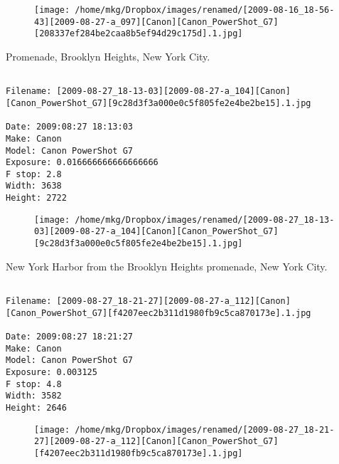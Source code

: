 \begin{figure}
\texttt{[image: /home/mkg/Dropbox/images/renamed/[2009-08-16\_18-56-43][2009-08-27-a\_097][Canon][Canon\_PowerShot\_G7][208337ef284be2caa8b5ef94d29c175d].1.jpg]}
\end{figure}
    
\clearpage
\onecolumn
\noindent Promenade, Brooklyn Heights, New York City.
\noindent
\begin{lstlisting}

Filename: [2009-08-27_18-13-03][2009-08-27-a_104][Canon][Canon_PowerShot_G7][9c28d3f3a000e0c5f805fe2e4be2be15].1.jpg

Date: 2009:08:27 18:13:03
Make: Canon
Model: Canon PowerShot G7
Exposure: 0.016666666666666666
F stop: 2.8
Width: 3638
Height: 2722
\end{lstlisting}
\clearpage

\begin{figure}
\texttt{[image: /home/mkg/Dropbox/images/renamed/[2009-08-27\_18-13-03][2009-08-27-a\_104][Canon][Canon\_PowerShot\_G7][9c28d3f3a000e0c5f805fe2e4be2be15].1.jpg]}
\end{figure}
    
\clearpage
\onecolumn
\noindent New York Harbor from the Brooklyn Heights promenade, New York City.
\noindent
\begin{lstlisting}

Filename: [2009-08-27_18-21-27][2009-08-27-a_112][Canon][Canon_PowerShot_G7][f4207eec2b311d1980fb9c5ca870173e].1.jpg

Date: 2009:08:27 18:21:27
Make: Canon
Model: Canon PowerShot G7
Exposure: 0.003125
F stop: 4.8
Width: 3582
Height: 2646
\end{lstlisting}
\clearpage

\begin{figure}
\texttt{[image: /home/mkg/Dropbox/images/renamed/[2009-08-27\_18-21-27][2009-08-27-a\_112][Canon][Canon\_PowerShot\_G7][f4207eec2b311d1980fb9c5ca870173e].1.jpg]}
\end{figure}
    

